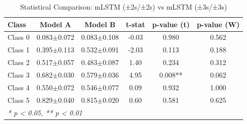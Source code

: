 \begin{table}[htbp]
\centering
\caption{Statistical Comparison: mLSTM (±2s/±2s) vs mLSTM (±3s/±3s)}
\label{tab:comparison_class_mlstm_±2s_±2s_vs_mlstm_±3s_±3s}
\begin{tabular}{lccccc}
\toprule
\textbf{Class} & \textbf{Model A} & \textbf{Model B} & \textbf{t-stat} & \textbf{p-value (t)} & \textbf{p-value (W)} \\
\midrule
Class 0 & 0.083$\pm$0.072 & 0.083$\pm$0.108 & -0.03 & 0.980 & 0.562 \\
Class 1 & 0.395$\pm$0.113 & 0.532$\pm$0.091 & -2.03 & 0.113 & 0.188 \\
Class 2 & 0.517$\pm$0.057 & 0.483$\pm$0.087 & 1.40 & 0.234 & 0.312 \\
Class 3 & 0.682$\pm$0.030 & 0.579$\pm$0.036 & 4.95 & 0.008** & 0.062 \\
Class 4 & 0.550$\pm$0.072 & 0.546$\pm$0.077 & 0.09 & 0.932 & 1.000 \\
Class 5 & 0.829$\pm$0.040 & 0.815$\pm$0.020 & 0.60 & 0.581 & 0.625 \\
\bottomrule
\multicolumn{6}{l}{\textit{* p < 0.05, ** p < 0.01}} \\
\end{tabular}
\end{table}